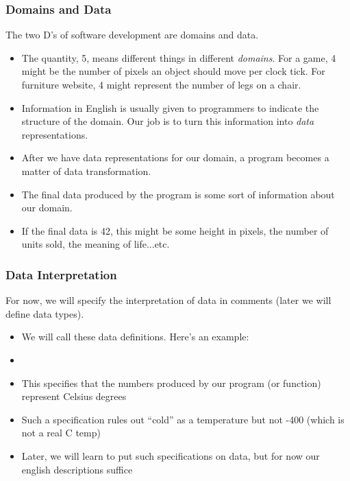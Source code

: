 \documentclass{beamer}
\begin{document}
\begin{frame}
  \frametitle{Domains and Data}
  The two D's of software development are domains and data.
  \begin{itemize}
  \item<2-> The quantity, 5, means different things in different \emph{domains}. For a game, 4 might be the number of pixels an object should move per clock tick. For furniture website, 4 might represent the number of legs on a chair.
  \item<3-> Information in English is usually given to programmers to indicate the structure of the domain. Our job is to turn this information into \emph{data}
    representations. 
  \item<4-> After we have data representations for our domain, a program becomes a matter of data transformation.
  \item<5-> The final data produced by the program is some sort of information about our domain.
  \item<6-> If the final data is 42, this might be some height in pixels, the number of units sold, the meaning of life...etc.
  \end{itemize}
\end{frame}


\begin{frame}
  \frametitle{Data Interpretation}
  For now, we will specify the interpretation of data in comments (later we will define data types).
  \begin{itemize}
  \item<2-> We will call these data definitions. Here's an example:
  \item<3-> \dataDef
  \item<4-> This specifies that the numbers produced by our program (or function) represent Celsius degrees
  \item<5-> Such a specification rules out ``cold'' as a temperature but not -400 (which is not a real C temp)
  \item<6-> Later, we will learn to put such specifications on data, but for now our english descriptions suffice
  \end{itemize}
\end{frame}
\end{document}
